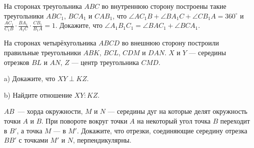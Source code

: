 \documentclass{article}
\begin{document}
\begin{enumerate_boxed}
        \item На сторонах треугольника $ABC$ во внутреннюю сторону построены такие треугольники $ABC_1$, $BCA_1$ и $CAB_1$, что $\angle AC_{1}B+\angle BA_{1}C+\angle CB_{1}A=360^\circ$ и $\frac{AC_1}{C_{1}B} \cdot \frac{BA_1}{A_{1}C}\cdot \frac{CB_1}{B_{1}A}=1$.
        Докажите, что $\angle A_{1}B_{1}C_1=\angle BAC_1+\angle BCA_1$.

        \item На сторонах четырёхугольника $ABCD$ во внешнюю сторону построили правильные треугольники $ABK$, $BCL$, $CDM$ и $DAN$. $X$ и $Y$ — середины отрезков $BL$ и $AN$, $Z$ — центр треугольника $CMD$.

        a) Докажите, что $XY\perp KZ$.

        b) Найдите отношение $XY:KZ$.

        \item $AB$~--- хорда окружности, $M$ и $N$ — середины дуг на которые делят окружность точки $A$ и $B$.
        При повороте вокруг точки $A$ на некоторый угол точка $B$ переходит в $B'$, а точка $M$ — в $M'$.
        Докажите, что отрезки, соединяющие середину отрезка $BB'$ с точками $M'$ и $N$, перпендикулярны.

    \end{enumerate_boxed}
\end{document}
